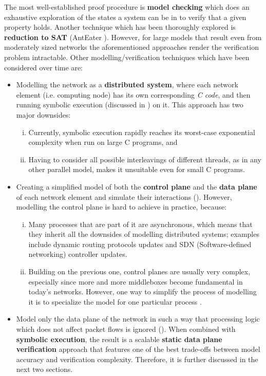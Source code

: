 The most well-established proof procedure is \textbf{model checking}
\cite{clarke1999model, mcmillan2003model} which does an exhaustive exploration
of the states a system can be in to verify that a given property holds. Another
technique which has been thoroughly explored is \textbf{reduction to SAT}
(AntEater \cite{mai2011debugging}).  However, for large models that result even
from moderately sized networks the aforementioned approaches render the
verification problem intractable.  Other modelling/verification techniques
which have been considered over time are:
\begin{itemize}
  \item Modelling the network as a \textbf{distributed system}, where each
    network element (i.e. computing node) has its own corresponding \emph{C
    code}, and then running symbolic execution (discussed in
    ) on it.  This approach has two
    major downsides:
      \begin{enumerate}[(i)]
        \item Currently, symbolic execution rapidly reaches its worst-case
          exponential complexity when run on large C programs, and
        \item Having to consider all possible interleavings of different
          threads, as in any other parallel model, makes it unsuitable even
          for small C programs.
      \end{enumerate}
  \item Creating a simplified model of both the \textbf{control plane} and the
    \textbf{data plane} of each network element and simulate their interactions
    ().  However, modelling the
    control plane is hard to achieve in practice, because:
    \begin{enumerate}[(i)]
      \item Many processes that are part of it are asynchronous, which means
        that they inherit all the downsides of modelling distributed systems;
        examples include dynamic routing protocols updates and SDN
        (Software-defined networking)
        controller updates.
      \item Building on the previous one, control planes are usually very
        complex, especially since more and more middleboxes become fundamental
        in today's networks.  However, one way to simplify the process of
        modelling it is to specialize the model for one particular process
        \cite{weitz2016bagpipe, fogel2015general}.
    \end{enumerate}
  \item Model only the data plane of the network in such a way that processing
    logic which does not affect packet flows is ignored
    ().  When combined with
    \textbf{symbolic execution}, the result is a scalable
    \textbf{static data plane verification} approach that features one of the
    best trade-offs between model accuracy and verification complexity.
    Therefore, it is further discussed in the next two sections.
\end{itemize}

